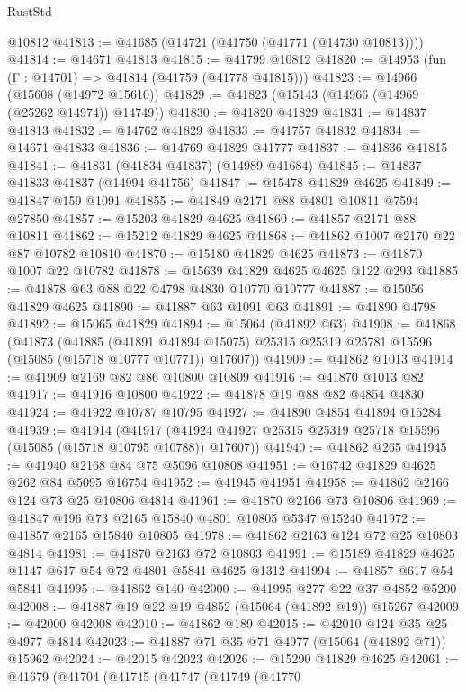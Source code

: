 \begin{lexlean}{RustStd}
\begin{coremodule}
    @10812
@41813 := @41685 (@14721 (@41750 (@41771 (@14730 @10813))))
@41814 := @14671 @41813
@41815 := @41799 @10812
@41820 := @14953 (fun (Γ : @14701) => @41814 (@41759 (@41778 @41815)))
@41823 := @14966 (@15608 (@14972 @15610))
@41829 := @41823 (@15143 (@14966 (@14969 (@25262 @14974)) @14749))
@41830 := @41820 @41829
@41831 := @14837 @41813
@41832 := @14762 @41829
@41833 := @41757 @41832
@41834 := @14671 @41833
@41836 := @14769 @41829 @41777
@41837 := @41836 @41815
@41841 := @41831 (@41834 @41837) (@14989 @41684)
@41845 := @14837 @41833 @41837 (@14994 @41756)
@41847 := @15478 @41829 @4625
@41849 := @41847 @159 @1091
@41855 := @41849 @2171 @88 @4801 @10811 @7594 @27850
@41857 := @15203 @41829 @4625
@41860 := @41857 @2171 @88 @10811
@41862 := @15212 @41829 @4625
@41868 := @41862 @1007 @2170 @22 @87 @10782 @10810
@41870 := @15180 @41829 @4625
@41873 := @41870 @1007 @22 @10782
@41878 := @15639 @41829 @4625 @4625 @122 @293
@41885 := @41878 @63 @88 @22 @4798 @4830 @10770 @10777
@41887 := @15056 @41829 @4625
@41890 := @41887 @63 @1091 @63
@41891 := @41890 @4798
@41892 := @15065 @41829
@41894 := @15064 (@41892 @63)
@41908 := @41868
    (@41873
      (@41885
        (@41891 @41894 @15075)
        @25315
        @25319
        @25781
        @15596
        (@15085 (@15718 @10777 @10771))
        @17607))
@41909 := @41862 @1013
@41914 := @41909 @2169 @82 @86 @10800 @10809
@41916 := @41870 @1013 @82
@41917 := @41916 @10800
@41922 := @41878 @19 @88 @82 @4854 @4830
@41924 := @41922 @10787 @10795
@41927 := @41890 @4854 @41894 @15284
@41939 := @41914
    (@41917 (@41924 @41927 @25315 @25319 @25718 @15596 (@15085 (@15718 @10795 @10788)) @17607))
@41940 := @41862 @265
@41945 := @41940 @2168 @84 @75 @5096 @10808
@41951 := @16742 @41829 @4625 @262 @84 @5095 @16754
@41952 := @41945 @41951
@41958 := @41862 @2166 @124 @73 @25 @10806 @4814
@41961 := @41870 @2166 @73 @10806
@41969 := @41847 @196 @73 @2165 @15840 @4801 @10805 @5347 @15240
@41972 := @41857 @2165 @15840 @10805
@41978 := @41862 @2163 @124 @72 @25 @10803 @4814
@41981 := @41870 @2163 @72 @10803
@41991 := @15189 @41829 @4625 @1147 @617 @54 @72 @4801 @5841 @4625 @1312
@41994 := @41857 @617 @54 @5841
@41995 := @41862 @140
@42000 := @41995 @277 @22 @37 @4852 @5200
@42008 := @41887 @19 @22 @19 @4852 (@15064 (@41892 @19)) @15267
@42009 := @42000 @42008
@42010 := @41862 @189
@42015 := @42010 @124 @35 @25 @4977 @4814
@42023 := @41887 @71 @35 @71 @4977 (@15064 (@41892 @71)) @15962
@42024 := @42015 @42023
@42026 := @15290 @41829 @4625
@42061 := @41679
    (@41704
      (@41745
        (@41747
          (@41749
            (@41770

\end{coremodule}
\end{lexlean}
